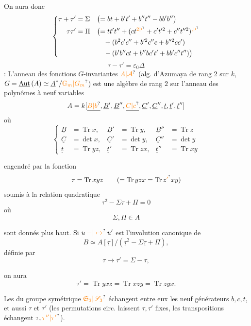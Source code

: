 On aura donc
\[
 \left\{\begin{aligned}
 \tau+\tau'&=\Sigma&&\bigl(=bt+b't'+b''t''-bb'b''\bigr)\\
 \tau\tau'&=\Pi&&\bigl(=tt't''+(ct^{\unsure{2|\prime}}+c't^{\prime 2}+c''t^{\prime\prime 2})^{\unsure{,|\prime}}\\
 &&&\quad+(b^2c'c''+b^{\prime 2}c''c+b^{\prime\prime 2}cc')\\
 &&&\quad-(b'b''ct+b''bc't'+bb'c''t'')\bigr)
 \end{aligned}\right.
\]
\[
 \tau-\tau'=\varepsilon_0\Delta
\]
 : L'anneau  des fonctions $G$-invariantes   $\unsure{A|\mathcal A}$ (alg. d'Azumaya de rang $2$ sur $k$\unsure{)|\}}, $G=\underline{\mathrm{Aut}}\,(A)\simeq\underline{A}^{*}/\unsure{\mathbb G_m|G_m}$) est une algèbre   de rang $2$ sur l'anneau des polynômes à neuf variables
\[
 A=k[\underline{\unsure{B|b}},\underline B',\underline B'',\underline{\unsure{C|c}},\underline C',\underline C'',\underline{t},\underline t',\underline t'']
\]
où
\[
 \left\{\begin{aligned}
 \underline B&=\operatorname{Tr}x,& \underline B'&=\operatorname{Tr}y,& \underline B''&=\operatorname{Tr}z\\
 \underline C&=\det x,& \underline C'&=\det y,& \underline C''&=\det y\\
 \underline t&=\operatorname{Tr}yz,& \underline t'&=\operatorname{Tr}zx,& \underline t''&=\operatorname{Tr}xy
 \end{aligned}\right.
\]

engendré par la fonction
\[
 \tau=\operatorname{Tr}xyz\qquad(=\operatorname{Tr}yzx=\operatorname{Tr}z^{\unsure{\prime}}xy)
\]
soumis à la relation quadratique
\[
 \boxed{\tau^2-\Sigma\tau+\Pi=0}
\]
où 
\[
 \Sigma,\Pi\in A
\]

sont donnés plus haut. Si $u\mathbin{\unsure{-|\mapsto}}u'$ est l'involution canonique de
\[
 B\simeq A[\underline\tau]/(\underline\tau^2-\Sigma\underline\tau+\Pi),
\]
définie par
\[
 \tau\longrightarrow\tau'=\Sigma-\tau,
\]

on aura
\[
 \tau'=\operatorname{Tr}yxz=\operatorname{Tr}xzy=\operatorname{Tr}zyx.
\]

Les  du groupe symétrique $\unsure{\mathfrak S_3|\mathscr S_3}$ échangent entre eux les neuf générateurs $\underline b,\underline c,\underline t$, et aussi $\tau$ et $\tau'$ (les permutations circ. laissent $\tau,\tau'$ fixes, les transpositions échangent $\tau,\unsure{\tau''|\tau'}$).

